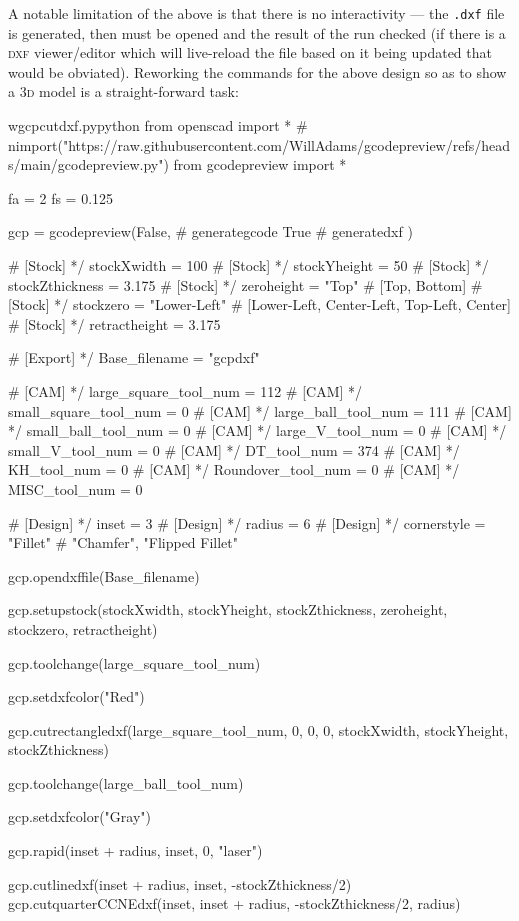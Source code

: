 \documentclass{ltxdoc}
\begin{document}
A notable limitation of the above is that there is no interactivity --- the \verb|.dxf| file is generated, then must be opened and the result of the run checked (if there is a \textsc{dxf} viewer/editor which will live-reload the file based on it being updated that would be obviated). Reworking the commands for the above design so as to show a \textsc{3d} model is a straight-forward task:

\lstset{firstnumber=1}%
\begin{writecode}{w}{gcpcutdxf.py}{python}
from openscad import *
# nimport("https://raw.githubusercontent.com/WillAdams/gcodepreview/refs/heads/main/gcodepreview.py")
from gcodepreview import *

fa = 2
fs = 0.125

gcp = gcodepreview(False, # generategcode
                   True   # generatedxf
                   )

# [Stock] */
stockXwidth = 100
# [Stock] */
stockYheight = 50
# [Stock] */
stockZthickness = 3.175
# [Stock] */
zeroheight = "Top"  # [Top, Bottom]
# [Stock] */
stockzero = "Lower-Left"  # [Lower-Left, Center-Left, Top-Left, Center]
# [Stock] */
retractheight = 3.175

# [Export] */
Base_filename = "gcpdxf"


# [CAM] */
large_square_tool_num = 112
# [CAM] */
small_square_tool_num = 0
# [CAM] */
large_ball_tool_num = 111
# [CAM] */
small_ball_tool_num = 0
# [CAM] */
large_V_tool_num = 0
# [CAM] */
small_V_tool_num = 0
# [CAM] */
DT_tool_num = 374
# [CAM] */
KH_tool_num = 0
# [CAM] */
Roundover_tool_num = 0
# [CAM] */
MISC_tool_num = 0

# [Design] */
inset = 3
# [Design] */
radius = 6
# [Design] */
cornerstyle = "Fillet"  # "Chamfer", "Flipped Fillet"

gcp.opendxffile(Base_filename)

gcp.setupstock(stockXwidth, stockYheight, stockZthickness, zeroheight, stockzero, retractheight)

gcp.toolchange(large_square_tool_num)

gcp.setdxfcolor("Red")

gcp.cutrectangledxf(large_square_tool_num, 0, 0, 0, stockXwidth, stockYheight, stockZthickness)

gcp.toolchange(large_ball_tool_num)

gcp.setdxfcolor("Gray")

gcp.rapid(inset + radius, inset, 0, "laser")

gcp.cutlinedxf(inset + radius, inset, -stockZthickness/2)
gcp.cutquarterCCNEdxf(inset, inset + radius, -stockZthickness/2, radius)


\end{writecode}
\end{document}
